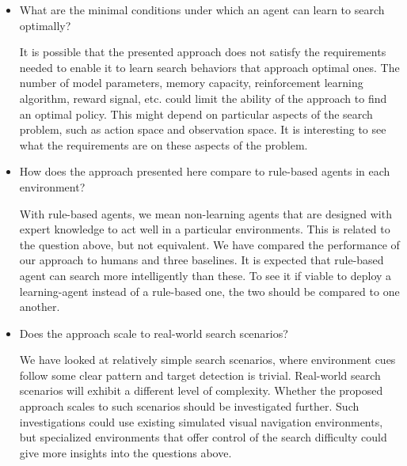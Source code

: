 \begin{itemize}
    \item What are the minimal conditions under which an agent can learn to search optimally?
    
    It is possible that the presented approach does not satisfy the requirements needed to enable it to learn search behaviors that approach optimal ones.
    The number of model parameters, memory capacity, reinforcement learning algorithm, reward signal, etc. could limit the ability of the approach to find an optimal policy.
    This might depend on particular aspects of the search problem, such as action space and observation space.
    It is interesting to see what the requirements are on these aspects of the problem.

    \item How does the approach presented here compare to rule-based agents in each environment?

    With rule-based agents, we mean non-learning agents that are designed with expert knowledge to act well in a particular environments.
    This is related to the question above, but not equivalent.
    We have compared the performance of our approach to humans and three baselines.
    It is expected that rule-based agent can search more intelligently than these.
    To see it if viable to deploy a learning-agent instead of a rule-based one, the two should be compared to one another.

    \item Does the approach scale to real-world search scenarios?

    We have looked at relatively simple search scenarios, where environment cues follow some clear pattern and target detection is trivial.
    Real-world search scenarios will exhibit a different level of complexity.
    Whether the proposed approach scales to such scenarios should be investigated further.
    Such investigations could use existing simulated visual navigation environments, but specialized environments that offer control of the search difficulty could give more insights into the questions above.
\end{itemize}

